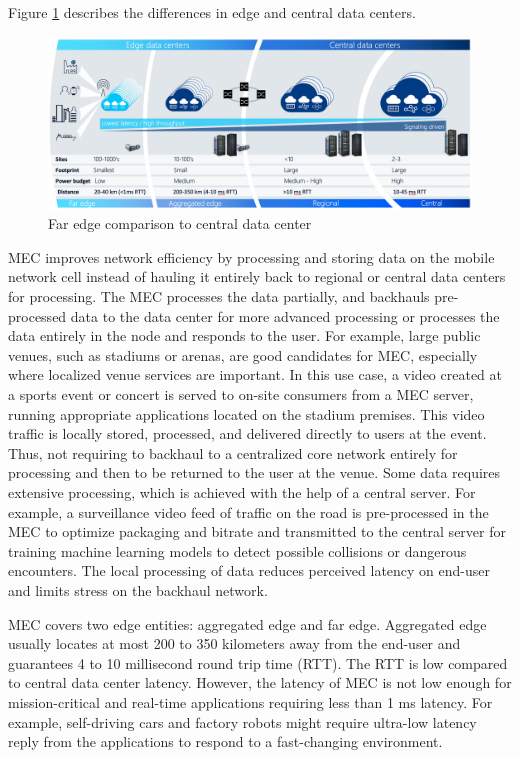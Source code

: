 Figure \ref{fig:AirFrame} describes the differences in edge and central data centers.

\begin{figure}[ht]
  \begin{center}
    \includegraphics[width=13.5cm]{images/AirFrame.png}
    \caption{Far edge comparison to central data center \cite{AirFrameOpenEdgeServer}}
    \label{fig:AirFrame}
  \end{center}
\end{figure}

MEC improves network efficiency by processing and storing data on the mobile network cell instead of hauling it entirely back to regional or central data centers for processing. The MEC processes the data partially, and backhauls pre-processed data to the data center for more advanced processing or processes the data entirely in the node and responds to the user. For example, large public venues, such as stadiums or arenas, are good candidates for MEC, especially where localized venue services are important. In this use case, a video created at a sports event or concert is served to on-site consumers from a MEC server, running appropriate applications located on the stadium premises. This video traffic is locally stored, processed, and delivered directly to users at the event. Thus, not requiring to backhaul to a centralized core network entirely for processing and then to be returned to the user at the venue. Some data requires extensive processing, which is achieved with the help of a central server. For example, a surveillance video feed of traffic on the road is pre-processed in the MEC to optimize packaging and bitrate and transmitted to the central server for training machine learning models to detect possible collisions or dangerous encounters. The local processing of data reduces perceived latency on end-user and limits stress on the backhaul network. \cite{Brown2016}

MEC covers two edge entities: aggregated edge and far edge. Aggregated edge usually locates at most 200 to 350 kilometers away from the end-user and guarantees 4 to 10 millisecond round trip time (RTT). The RTT is low compared to central data center latency. However, the latency of MEC is not low enough for mission-critical and real-time applications requiring less than 1 ms latency. For example, self-driving cars and factory robots might require ultra-low latency reply from the applications to respond to a fast-changing environment.

